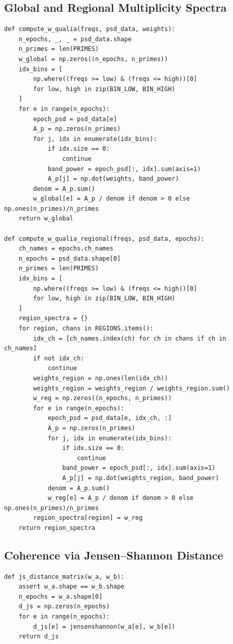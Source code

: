 \documentclass[11pt]{article}
\begin{document}
\subsection{Global and Regional Multiplicity Spectra}

\begin{verbatim}
def compute_w_qualia(freqs, psd_data, weights):
    n_epochs, _, _ = psd_data.shape
    n_primes = len(PRIMES)
    w_global = np.zeros((n_epochs, n_primes))
    idx_bins = [
        np.where((freqs >= low) & (freqs <= high))[0]
        for low, high in zip(BIN_LOW, BIN_HIGH)
    ]
    for e in range(n_epochs):
        epoch_psd = psd_data[e]
        A_p = np.zeros(n_primes)
        for j, idx in enumerate(idx_bins):
            if idx.size == 0:
                continue
            band_power = epoch_psd[:, idx].sum(axis=1)
            A_p[j] = np.dot(weights, band_power)
        denom = A_p.sum()
        w_global[e] = A_p / denom if denom > 0 else np.ones(n_primes)/n_primes
    return w_global

def compute_w_qualia_regional(freqs, psd_data, epochs):
    ch_names = epochs.ch_names
    n_epochs = psd_data.shape[0]
    n_primes = len(PRIMES)
    idx_bins = [
        np.where((freqs >= low) & (freqs <= high))[0]
        for low, high in zip(BIN_LOW, BIN_HIGH)
    ]
    region_spectra = {}
    for region, chans in REGIONS.items():
        idx_ch = [ch_names.index(ch) for ch in chans if ch in ch_names]
        if not idx_ch:
            continue
        weights_region = np.ones(len(idx_ch))
        weights_region = weights_region / weights_region.sum()
        w_reg = np.zeros((n_epochs, n_primes))
        for e in range(n_epochs):
            epoch_psd = psd_data[e, idx_ch, :]
            A_p = np.zeros(n_primes)
            for j, idx in enumerate(idx_bins):
                if idx.size == 0:
                    continue
                band_power = epoch_psd[:, idx].sum(axis=1)
                A_p[j] = np.dot(weights_region, band_power)
            denom = A_p.sum()
            w_reg[e] = A_p / denom if denom > 0 else np.ones(n_primes)/n_primes
        region_spectra[region] = w_reg
    return region_spectra
\end{verbatim}

\subsection{Coherence via Jensen--Shannon Distance}

\begin{verbatim}
def js_distance_matrix(w_a, w_b):
    assert w_a.shape == w_b.shape
    n_epochs = w_a.shape[0]
    d_js = np.zeros(n_epochs)
    for e in range(n_epochs):
        d_js[e] = jensenshannon(w_a[e], w_b[e])
    return d_js
\end{verbatim}
\end{document}
